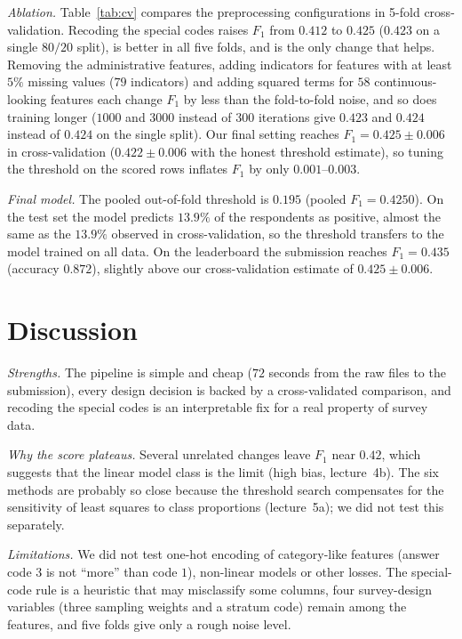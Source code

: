 \documentclass[10pt,conference,compsocconf]{IEEEtran}
\begin{document}
\emph{Ablation.} Table~\ref{tab:cv} compares the preprocessing
configurations in 5-fold cross-validation. Recoding the special codes
raises $F_1$ from $0.412$ to $0.425$ ($0.423$ on a single $80/20$
split), is better in all five folds, and is the only change that helps.
Removing the administrative features, adding indicators for features
with at least $5\%$ missing values ($79$ indicators) and adding squared
terms for $58$ continuous-looking features each change $F_1$ by less
than the fold-to-fold noise, and so does training longer ($1000$ and
$3000$ instead of $300$ iterations give $0.423$ and $0.424$ instead of
$0.424$ on the single split). Our final setting reaches
$F_1=0.425\pm0.006$ in cross-validation ($0.422\pm0.006$ with the
honest threshold estimate), so tuning the threshold on the scored rows
inflates $F_1$ by only $0.001$--$0.003$.

\emph{Final model.} The pooled out-of-fold threshold is $0.195$
(pooled $F_1=0.4250$). On the test set the model predicts $13.9\%$ of the
respondents as positive, almost the same as the $13.9\%$ observed in
cross-validation, so the threshold transfers to the model trained on
all data. On the leaderboard the submission reaches $F_1=0.435$
(accuracy $0.872$), slightly above our cross-validation estimate of
$0.425\pm0.006$.

\section{Discussion}

\emph{Strengths.} The pipeline is simple and cheap ($72$ seconds from
the raw files to the submission), every design decision is backed by a
cross-validated comparison, and recoding the special codes is an
interpretable fix for a real property of survey data.

\emph{Why the score plateaus.} Several unrelated changes leave $F_1$
near $0.42$, which suggests that the linear model class is the limit
(high bias, lecture~4b). The six methods are probably so close because
the threshold search compensates for the sensitivity of least squares
to class proportions (lecture~5a); we did not test this separately.

\emph{Limitations.} We did not test one-hot encoding of category-like
features (answer code $3$ is not ``more'' than code $1$), non-linear
models or other losses. The special-code rule is a heuristic that may
misclassify some columns, four survey-design variables (three sampling
weights and a stratum code) remain among the features, and five folds
give only a rough noise level.
\end{document}
